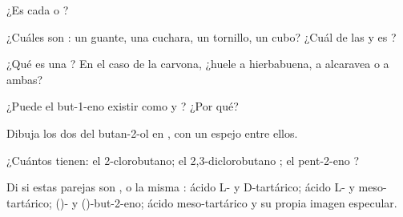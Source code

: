 \begin{exercise}[$\star$]\label{exo:g12:stereochemistry:2}
¿Es cada  o ?
\begin{center}
 \qquad
{}
\end{center}
\end{exercise}

\begin{exercise}[$\star$]\label{exo:g12:stereochemistry:3}
¿Cuáles son : un guante, una cuchara, un tornillo, un cubo? ¿Cuál
de las   y  es ?
\end{exercise}

\begin{exercise}[$\star$]\label{exo:g12:stereochemistry:4}
¿Qué es una ? En el caso de la carvona, ¿huele a
hierbabuena, a alcaravea o a ambas?
\end{exercise}

\begin{exercise}[$\star$]\label{exo:g12:stereochemistry:5}
¿Puede el but-1-eno  existir como  y ?
¿Por qué?
\end{exercise}

\begin{exercise}[$\star\star$]\label{exo:g12:stereochemistry:6}
Dibuja los dos  del butan-2-ol en , con
un espejo entre ellos.
\end{exercise}

\begin{exercise}[$\star\star$]\label{exo:g12:stereochemistry:7}
¿Cuántos  tienen: el 2-clorobutano; el
2,3-diclorobutano ; el pent-2-eno
?
\end{exercise}

\begin{exercise}[$\star\star$]\label{exo:g12:stereochemistry:8}
Di si estas parejas son ,  o la misma
: ácido L- y D-tartárico; ácido L- y meso-tartárico; ()- y
()-but-2-eno; ácido meso-tartárico y su propia imagen especular.
\end{exercise}

